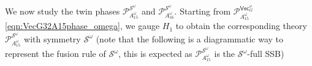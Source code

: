 \documentclass[aps,twocolumn,prx,floatfix,preprintnumbers, nofootinbib,10pt]{revtex4-2}
\numberwithin{equation}{section}
\theoremstyle{definition}
\newcommand{\be}{\begin{equation}}
\newcommand{\cP}{\mathcal{P}}
\newcommand{\cS}{\mathcal{S}}
\renewcommand{\Vec}{\mathsf{Vec}}
\begin{document}
We now study the twin phases $\cP^{\cS^\omega}_{A_{15}^\omega}$ and $\cP^{\cS^\omega}_{A_{16}^\omega}$. Starting from $\cP^{\Vec_G^\omega}_{A_{15}^\omega}$ \eqref{eqn:VecG32A15phase_omega}, we gauge $H_1$ to obtain the corresponding theory $\cP^{\cS^\omega}_{A_{15}^\omega}$ with symmetry $\cS^\omega$ (note that the following is a diagrammatic way to represent the fusion rule of $\cS^\omega$, this is expected as $\cP^{\cS^\omega}_{A_{15}^\omega}$ is the $\cS^\omega$-full SSB)
\end{document}
